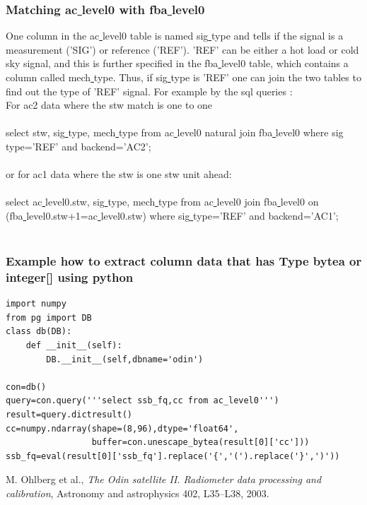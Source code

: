 \documentclass[12pt]{article}
\begin{document}
\subsubsection*{Matching ac\underline{ }level0 with fba\underline{ }level0}
 One column in the ac\underline{ }level0
table is named sig\underline{ }type and tells if the signal is 
a measurement ('SIG') or reference ('REF').
'REF' can be either a hot load or cold sky signal, and this is
further specified in the fba\underline{ }level0 table,
which contains a column called mech\underline{ }type.
Thus, if sig\underline{ }type is 'REF' one can join the two
tables to find out the type of 'REF' signal.
For example by the sql queries :\\
For ac2 data where the stw match is one to one\\
\\
select stw, sig\underline{ }type, mech\underline{ }type from 
ac\underline{ }level0 natural join fba\underline{ }level0 
where sig\underline{ }type='REF' and backend='AC2';\\
\\
or for ac1 data where the stw is one stw unit ahead:\\
\\
select ac\underline{ }level0.stw, sig\underline{ }type,
mech\underline{ }type from 
ac\underline{ }level0 join fba\underline{ }level0 on\\ 
(fba\underline{ }level0.stw+1=ac\underline{ }level0.stw) where 
sig\underline{ }type='REF' and backend='AC1';\\
\\ 
\subsubsection*{Example how to extract column data that has Type bytea
or integer[] using python}
\begin{verbatim}
import numpy
from pg import DB
class db(DB):
    def __init__(self):
        DB.__init__(self,dbname='odin')

con=db()
query=con.query('''select ssb_fq,cc from ac_level0''')
result=query.dictresult()
cc=numpy.ndarray(shape=(8,96),dtype='float64',
                 buffer=con.unescape_bytea(result[0]['cc']))
ssb_fq=eval(result[0]['ssb_fq'].replace('{','(').replace('}',')'))

\end{verbatim}


\clearpage
\newpage



\clearpage
\newpage

\begin{thebibliography}{1}

 M. Ohlberg et al., {\em The Odin satellite
II. Radiometer data processing and calibration},
Astronomy and astrophysics 402, L35--L38, 2003.

\end{thebibliography}
\end{document}
